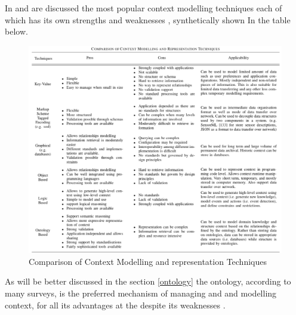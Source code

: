 \documentclass{thesisreport}
\begin{document}
 In \cite{chen2000survey} and \cite{strang2004context} are discussed the most popular context modelling techniques each of which has its own strengths and weaknesses \cite{perera2014context}, synthetically shown In the table below.
 
 	\begin{figure}[H]
		\centering
		\includegraphics[width=17.5cm]{Thesis/data/ContextModelComparison.png}
		\caption{Comparison of Context Modelling and representation Techniques \cite{perera2014context}}
		\label{fig:populationProspect}
	\end{figure}
 As will be better discussed in the section \ref{ontology} the ontology, according to many surveys, is the preferred mechanism of managing and and modelling context, for all its advantages at the despite its weaknesses \cite{perera2014context}.
 
 
\end{document}

